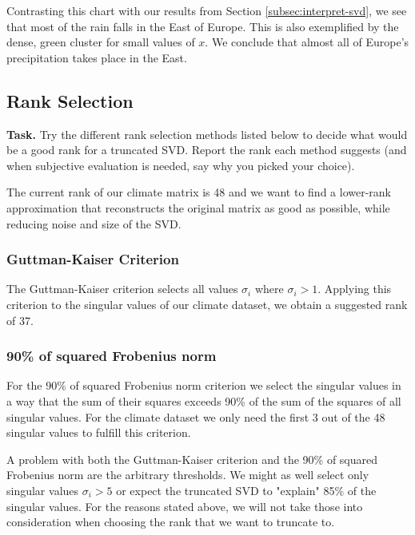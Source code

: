 \documentclass{support/acm_proc_article-sp}
\begin{document}
    Contrasting this chart with our results from Section \ref{subsec:interpret-svd}, we see that most of the rain falls in
    the East of Europe.
    This is also exemplified by the dense, green cluster for small values of $x$.
    We conclude that almost all of Europe's precipitation takes place in the East.


    \subsection{Rank Selection}

    \textbf{Task.} Try the different rank selection methods listed below to decide what would be a good rank for a
    truncated SVD.
    Report the rank each method suggests (and when subjective evaluation is needed, say why you picked your choice).

    The current rank of our climate matrix is 48 and we want to find a lower-rank approximation that reconstructs the
    original matrix as good as possible, while reducing noise and size of the SVD\@.

    \subsubsection{Guttman-Kaiser Criterion}

    The Guttman-Kaiser criterion selects all values $\sigma_i$ where $\sigma_i > 1$.
    Applying this criterion to the singular values of our climate dataset, we obtain a suggested rank of 37.

    \subsubsection{90\% of squared Frobenius norm}

    For the 90\% of squared Frobenius norm criterion we select the singular values in a way that the sum of their squares
    exceeds 90\% of the sum of the squares of all singular values.
    For the climate dataset we only need the first 3 out of the 48 singular values to fulfill this criterion.

    A problem with both the Guttman-Kaiser criterion and the 90\% of squared Frobenius norm are the arbitrary thresholds.
    We might as well select only singular values $\sigma_i > 5$ or expect the truncated SVD to "explain" 85\% of the
    singular values.
    For the reasons stated above, we will not take those into consideration when choosing the rank that we want to
    truncate to.
\end{document}
